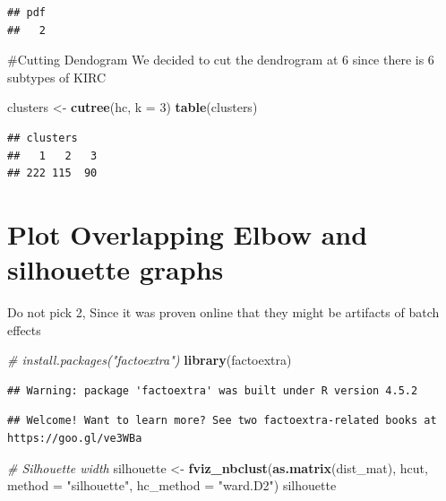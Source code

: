 \documentclass[
]{article}
\newenvironment{Shaded}{\begin{snugshade}}{\end{snugshade}}
\newcommand{\AttributeTok}[1]{\textcolor[rgb]{0.13,0.29,0.53}{#1}}
\newcommand{\CommentTok}[1]{\textcolor[rgb]{0.56,0.35,0.01}{\textit{#1}}}
\newcommand{\DecValTok}[1]{\textcolor[rgb]{0.00,0.00,0.81}{#1}}
\newcommand{\FunctionTok}[1]{\textcolor[rgb]{0.13,0.29,0.53}{\textbf{#1}}}
\newcommand{\NormalTok}[1]{#1}
\newcommand{\OtherTok}[1]{\textcolor[rgb]{0.56,0.35,0.01}{#1}}
\newcommand{\StringTok}[1]{\textcolor[rgb]{0.31,0.60,0.02}{#1}}
\begin{document}
\begin{verbatim}
## pdf 
##   2
\end{verbatim}

\#Cutting Dendogram We decided to cut the dendrogram at 6 since there is
6 subtypes of KIRC

\begin{Shaded}
\begin{Highlighting}[]
\NormalTok{clusters }\OtherTok{\textless{}{-}} \FunctionTok{cutree}\NormalTok{(hc, }\AttributeTok{k =} \DecValTok{3}\NormalTok{)}
\FunctionTok{table}\NormalTok{(clusters)}
\end{Highlighting}
\end{Shaded}

\begin{verbatim}
## clusters
##   1   2   3 
## 222 115  90
\end{verbatim}

\section{Plot Overlapping Elbow and silhouette
graphs}\label{plot-overlapping-elbow-and-silhouette-graphs}

Do not pick 2, Since it was proven online that they might be artifacts
of batch effects

\begin{Shaded}
\begin{Highlighting}[]
\CommentTok{\# install.packages("factoextra")}
\FunctionTok{library}\NormalTok{(factoextra)}
\end{Highlighting}
\end{Shaded}

\begin{verbatim}
## Warning: package 'factoextra' was built under R version 4.5.2
\end{verbatim}

\begin{verbatim}
## Welcome! Want to learn more? See two factoextra-related books at https://goo.gl/ve3WBa
\end{verbatim}

\begin{Shaded}
\begin{Highlighting}[]
\CommentTok{\# Silhouette width }
\NormalTok{silhouette }\OtherTok{\textless{}{-}} \FunctionTok{fviz\_nbclust}\NormalTok{(}\FunctionTok{as.matrix}\NormalTok{(dist\_mat), hcut, }\AttributeTok{method =} \StringTok{"silhouette"}\NormalTok{, }\AttributeTok{hc\_method =} \StringTok{"ward.D2"}\NormalTok{)}
\NormalTok{silhouette}
\end{Highlighting}
\end{Shaded}
\end{document}
